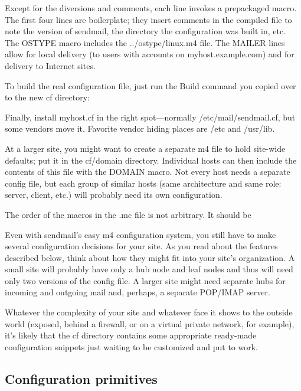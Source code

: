
Except for the diversions and comments, each line invokes a prepackaged
macro. The first four lines are boilerplate; they insert comments in the
compiled file to note the version of {sendmail}, the directory the
configuration was built in, etc. The {OSTYPE} macro includes the
{../ostype/linux.m4} file. The {MAILER} lines allow for local delivery
(to users with accounts on myhost.example.com) and for delivery to
Internet sites.

To build the real configuration file, just run the {Build} command you
copied over to the new {cf} directory:


Finally, install {myhost.cf} in the right spot---normally
{/etc/mail/sendmail.cf}, but some vendors move it. Favorite vendor
hiding places are {/etc} and {/usr/lib}.

At a larger site, you might want to create a separate {m4} file to hold
site-wide defaults; put it in the {cf/domain} directory. Individual
hosts can then include the contents of this file with the {DOMAIN}
macro. Not every host needs a separate config file, but each group of
similar hosts (same architecture and same role: server, client, etc.)
will probably need its own configuration.

The order of the macros in the {.mc} file is not arbitrary. It should be


Even with {sendmail}'s easy {m4} configuration system, you still have to
make several configuration decisions for your site. As you read about
the features described below, think about how they might fit into your
site's organization. A small site will probably have only a hub node and
leaf nodes and thus will need only two versions of the config file. A
larger site might need separate hubs for incoming and outgoing mail and,
perhaps, a separate POP/IMAP server.

Whatever the complexity of your site and whatever face it shows to the
outside world (exposed, behind a firewall, or on a virtual private
network, for example), it's likely that the {cf} directory contains some
appropriate ready-made configuration snippets just waiting to be
customized and put to work.

\protect\hypertarget{part0026_split_032.html}{}{}

\hypertarget{part0026_split_032.htmlux5cux23_idContainer1247}{}
\hypertarget{part0026_split_032.htmlux5cux23calibre_pb_31}{%
\subsection[Configuration
primitives]{\texorpdfstring{\protect\hypertarget{part0026_split_032.htmlux5cux23_idTextAnchor1061}{}{}Configuration
primitives}{Configuration primitives}}\label{part0026_split_032.htmlux5cux23calibre_pb_31}}

